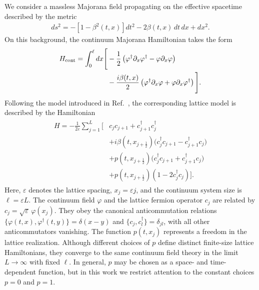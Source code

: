 \documentclass[reprint,amsmath,amssymb,aps,prb,showkeys]{revtex4-2}
\begin{document}
We consider a massless Majorana field propagating on the effective spacetime described by the metric
\begin{align}
    ds^{2} =
    -\left[1-\beta^{2}(t,x)\right]dt^{2}
    - 2\beta(t,x)\,dt\,dx
    + dx^{2}.
    \label{simplified_metric}
\end{align}
On this background, the continuum Majorana Hamiltonian takes the form
\begin{align}
\begin{split}
H_{\rm cont}
= \int_{0}^{\ell} dx \Bigg[
&-\frac{1}{2}
\left(
\varphi^\dagger \partial_x \varphi^\dagger
-
\varphi \partial_x \varphi
\right) \\
&-\frac{i\beta(t,x)}{2}
\left(
\varphi^\dagger \partial_x \varphi
+
\varphi \partial_x \varphi^\dagger
\right)
\Bigg].
\end{split}
\label{continuum_hamiltonian_simplified}
\end{align}
Following the model introduced in Ref.~\cite{PhysRevResearch.7.023197}, the corresponding lattice model is described by the Hamiltonian
\begin{align}
\begin{split}
H
= - \frac{1}{2\varepsilon} \sum_{j=1}^{L} \Bigg[
&
c_{j}c_{j+1}
+
c_{j+1}^{\dagger}c_{j}^{\dagger}
\\
&+
i\beta(t,x_{j+\frac12})
\Big(
c_{j}^{\dagger}c_{j+1}
-
c_{j+1}^{\dagger}c_{j}
\Big)
\\
&+
p(t,x_{j+\frac{1}{2}})
\Big(
c_{j}^{\dagger}c_{j+1}
+
c_{j+1}^{\dagger}c_{j}
\Big)
\\
&+
p(t,x_{j+\frac{1}{2}})
\left(
1-2c_{j}^{\dagger}c_{j}
\right)
\Bigg].
\end{split}
\label{symmetrized_lattice_hamiltonian}
\end{align}
Here, $\varepsilon$ denotes the lattice spacing, $x_j=\varepsilon j$, and the continuum system size is $\ell=\varepsilon L$.
The continuum field $\varphi$ and the lattice fermion operator $c_j$ are related by $c_j=\sqrt{\varepsilon}\,\varphi(x_j)$.
They obey the canonical anticommutation relations
$\{\varphi(t,x),\varphi^{\dagger}(t,y)\}=\delta(x-y)$ and
$\{c_j,c_l^{\dagger}\}=\delta_{jl}$, with all other anticommutators vanishing.
The function $p(t,x_j)$ represents a freedom in the lattice realization.
Although different choices of $p$ define distinct finite-size lattice Hamiltonians, they converge to the same continuum field theory in the limit $L\to\infty$ with fixed $\ell$.
In general, $p$ may be chosen as a space- and time-dependent function, but in this work we restrict attention to the constant choices $p=0$ and $p=1$.
\end{document}
